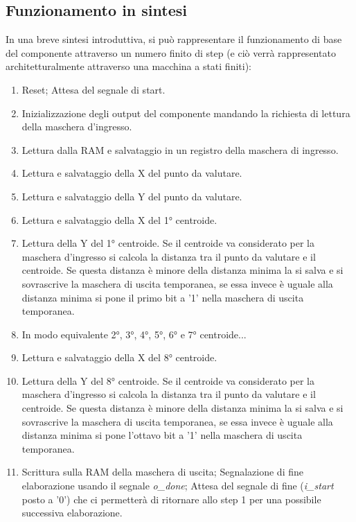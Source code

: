 \documentclass{article}
\begin{document}
\subsection{Funzionamento in sintesi}
In una breve sintesi introduttiva, si può rappresentare il funzionamento di base del componente attraverso un numero finito di step (e ciò verrà rappresentato architetturalmente attraverso una macchina a stati finiti):
\begin{enumerate}
  \item Reset; Attesa del segnale di start.
  \item Inizializzazione degli output del componente mandando la richiesta di lettura della maschera d'ingresso.
  \item Lettura dalla RAM e salvataggio in un registro della maschera di ingresso.
  \item Lettura e salvataggio della X del punto da valutare.
  \item Lettura e salvataggio della Y del punto da valutare.
  \item Lettura e salvataggio della X del 1° centroide.
  \item Lettura della Y del 1° centroide. Se il centroide va considerato per la maschera d'ingresso si calcola la distanza tra il punto da valutare e il centroide. Se questa distanza è minore della distanza minima la si salva e si sovrascrive la maschera di uscita temporanea, se essa invece è uguale alla distanza minima si pone il primo bit a '1' nella maschera di uscita temporanea.
  \item In modo equivalente 2°, 3°, 4°, 5°, 6° e 7° centroide... \addtocounter{enumi}{11}
  \item Lettura e salvataggio della X del 8° centroide.
  \item Lettura della Y del 8° centroide. Se il centroide va considerato per la maschera d'ingresso si calcola la distanza tra il punto da valutare e il centroide. Se questa distanza è minore della distanza minima la si salva e si sovrascrive la maschera di uscita temporanea, se essa invece è uguale alla distanza minima si pone l'ottavo bit a '1' nella maschera di uscita temporanea.
  \item Scrittura sulla RAM della maschera di uscita; Segnalazione di fine elaborazione usando il segnale \textit{o\_done}; Attesa del segnale di fine (\textit{i\_start} posto a '0') che ci permetterà di ritornare allo step 1 per una possibile successiva elaborazione.
\end{enumerate}
\end{document}
